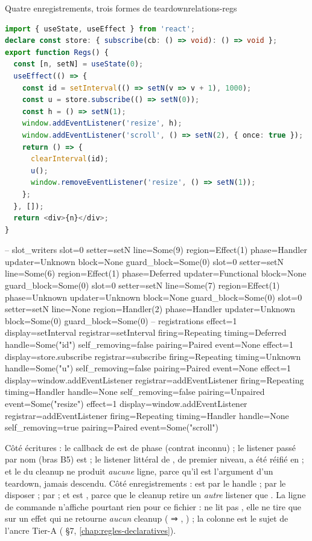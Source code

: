 \begin{exemple}{Quatre enregistrements, trois formes de teardown}{relations-regs}
\begin{lstlisting}[language=TypeScript,caption={\file{/tmp/ch14/regs.tsx}},label={lst:relations-regs}]
import { useState, useEffect } from 'react';
declare const store: { subscribe(cb: () => void): () => void };
export function Regs() {
  const [n, setN] = useState(0);
  useEffect(() => {
    const id = setInterval(() => setN(v => v + 1), 1000);
    const u = store.subscribe(() => setN(0));
    const h = () => setN(1);
    window.addEventListener('resize', h);
    window.addEventListener('scroll', () => setN(2), { once: true });
    return () => {
      clearInterval(id);
      u();
      window.removeEventListener('resize', () => setN(1));
    };
  }, []);
  return <div>{n}</div>;
}
\end{lstlisting}
\begin{sortie}
-- slot_writers
  slot=0 setter=setN line=Some(9) region=Effect(1)  phase=Handler  updater=Unknown    block=None    guard_block=Some(0)
  slot=0 setter=setN line=Some(6) region=Effect(1)  phase=Deferred updater=Functional block=None    guard_block=Some(0)
  slot=0 setter=setN line=Some(7) region=Effect(1)  phase=Unknown  updater=Unknown    block=None    guard_block=Some(0)
  slot=0 setter=setN line=None    region=Handler(2) phase=Handler  updater=Unknown    block=Some(0) guard_block=Some(0)
-- registrations
  effect=1 display=setInterval             registrar=setInterval      firing=Repeating timing=Deferred handle=Some("id") self_removing=false pairing=Paired   event=None
  effect=1 display=store.subscribe         registrar=subscribe        firing=Repeating timing=Unknown  handle=Some("u")  self_removing=false pairing=Paired   event=None
  effect=1 display=window.addEventListener registrar=addEventListener firing=Repeating timing=Handler  handle=None       self_removing=false pairing=Unpaired event=Some("resize")
  effect=1 display=window.addEventListener registrar=addEventListener firing=Repeating timing=Handler  handle=None       self_removing=true  pairing=Paired   event=Some("scroll")
\end{sortie}
Côté écritures : le callback de  est de phase  (contrat inconnu) ; le listener  passé par nom (bras B5) est  ; le listener littéral de , de premier niveau, a été réifié en  ; et le  du cleanup ne produit \emph{aucune} ligne, parce qu'il est l'argument d'un teardown, jamais descendu. Côté enregistrements :  est  par le handle  ;  par le disposer  ;  par  ; et  est , parce que le cleanup retire un \emph{autre} listener que . La ligne de commande n'affiche pourtant rien pour ce fichier :  ne lit pas , elle ne tire que sur un effet qui ne retourne \emph{aucun} cleanup ( ⇒ , ) ; la colonne  est le sujet de l'ancre Tier-A  ( §7, \cref{chap:regles-declaratives}).

\end{exemple}
